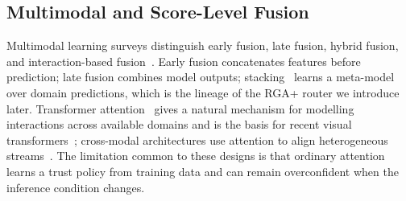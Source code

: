 \documentclass[10pt,conference]{IEEEtran}
\newcommand{\methodplus}{RGA+}
\begin{document}
\subsection{Multimodal and Score-Level Fusion}
Multimodal learning surveys distinguish early fusion, late fusion, hybrid
fusion, and interaction-based fusion~\cite{baltrusaitis2019multimodal,lahat2015multimodal,atrey2010multimodal,hall1997introduction,dasarathy1997sensor,poria2017review,ngiam2011multimodal}.
Early fusion concatenates features before prediction; late fusion combines
model outputs; stacking~\cite{wolpert1992stacked} learns a meta-model over
domain predictions, which is the lineage of the \methodplus{} router we
introduce later. Transformer attention~\cite{vaswani2017attention} gives a
natural mechanism for modelling interactions across available domains and is
the basis for recent visual transformers~\cite{dosovitskiy2020vit,liu2021swin,jaegle2021perceiver,ramachandran2019stand};
cross-modal architectures use attention to align heterogeneous
streams~\cite{radford2021learning,lu2019vilbert,girdhar2022omnivore}. The
limitation common to these designs is that ordinary attention learns a trust
policy from training data and can remain overconfident when the inference
condition changes.
\end{document}
